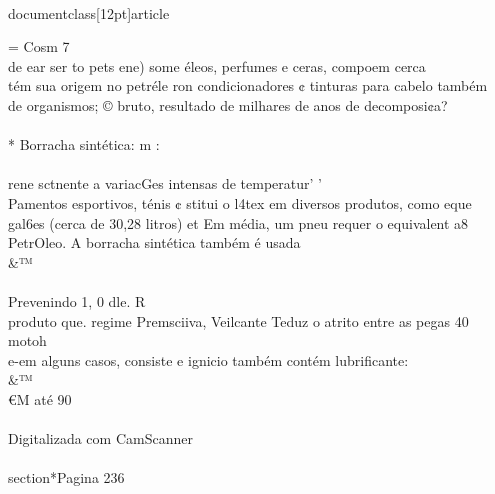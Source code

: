 \\documentclass[12pt]{article}
\begin{document}
= Cosm 7\\
de ear ser to pets ene) some éleos, perfumes e ceras, compoem cerca\\
tém sua origem no petréle ron condicionadores ¢ tinturas para cabelo também\\
de organismos; © bruto, resultado de milhares de anos de decomposi¢a?\\
\\
* Borracha sintética: m :\\
\\
rene sctnente a variacGes intensas de temperatur’ '\\
Pamentos esportivos, ténis ¢ stitui o l4tex em diversos produtos, como eque\\
gal6es (cerca de 30,28 litros) et Em média, um pneu requer o equivalent a8\\
PetrOleo. A borracha sintética também é usada \\&™\\
\\
Prevenindo 1, 0 dle. R\\
produto que. regime Premsciiva, Veilcante Teduz o atrito entre as pegas 40 motoh\\
e-em alguns casos, consiste e ignicio também contém lubrificante: \\&™\\
€M até 90\\%
\\
Digitalizada com CamScanner\\

\\section*{Pagina 236}
\end{document}
